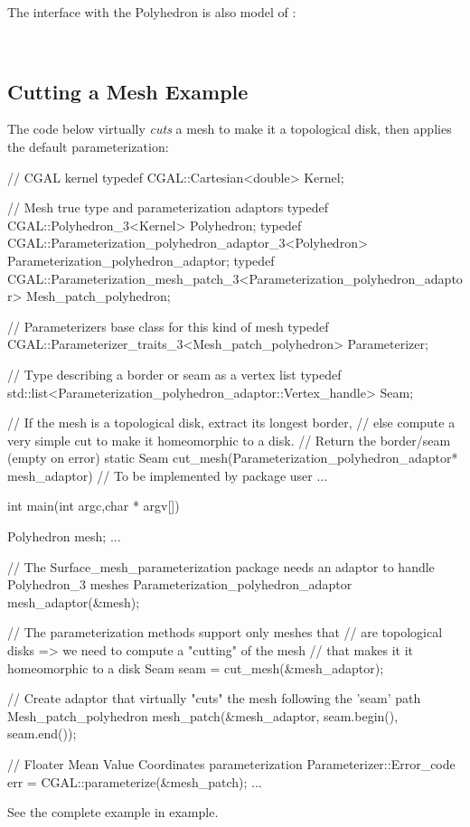 The  interface with the Polyhedron is also model of
:

  \\


\subsection{Cutting a Mesh Example}

The code below virtually {\em cuts} a  mesh to make
it a topological disk, then applies the default parameterization:

\begin{ccExampleCode}

// CGAL kernel
typedef CGAL::Cartesian<double>                             Kernel;

// Mesh true type and parameterization adaptors
typedef CGAL::Polyhedron_3<Kernel>                          Polyhedron;
typedef CGAL::Parameterization_polyhedron_adaptor_3<Polyhedron>
                                                            Parameterization_polyhedron_adaptor;
typedef CGAL::Parameterization_mesh_patch_3<Parameterization_polyhedron_adaptor>
                                                            Mesh_patch_polyhedron;

// Parameterizers base class for this kind of mesh
typedef CGAL::Parameterizer_traits_3<Mesh_patch_polyhedron> Parameterizer;

// Type describing a border or seam as a vertex list
typedef std::list<Parameterization_polyhedron_adaptor::Vertex_handle>
                                                            Seam;

// If the mesh is a topological disk, extract its longest border,
// else compute a very simple cut to make it homeomorphic to a disk.
// Return the border/seam (empty on error)
static Seam cut_mesh(Parameterization_polyhedron_adaptor* mesh_adaptor)
{
    // To be implemented by package user
    ...
}

int main(int argc,char * argv[])
{
    Polyhedron mesh;
    ...

    // The Surface_mesh_parameterization package needs an adaptor to handle Polyhedron_3 meshes
    Parameterization_polyhedron_adaptor mesh_adaptor(&mesh);

    // The parameterization methods support only meshes that
    // are topological disks => we need to compute a "cutting" of the mesh
    // that makes it it homeomorphic to a disk
    Seam seam = cut_mesh(&mesh_adaptor);

    // Create adaptor that virtually "cuts" the mesh following the 'seam' path
    Mesh_patch_polyhedron   mesh_patch(&mesh_adaptor,
                                       seam.begin(),
                                       seam.end());

    // Floater Mean Value Coordinates parameterization
    Parameterizer::Error_code err = CGAL::parameterize(&mesh_patch);
    ...
}

\end{ccExampleCode}

See the complete example in 
example.


